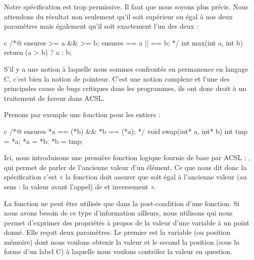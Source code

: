 Notre spécification est trop permissive. Il faut que nous soyons plus précis.
Nous attendons du résultat non seulement qu'il soit supérieur ou égal à nos 
deux paramètres mais également qu'il soit exactement l'un des deux :



\begin{CodeBlock}{c}
/*@
  ensures \result >= a && \result >= b;
  ensures \result == a || \result == b;
*/
int max(int a, int b){
  return (a > b) ? a : b;
}
\end{CodeBlock}





S'il y a une notion à laquelle nous sommes confrontés en permanence en 
langage C, c'est bien la notion de pointeur. C'est une notion complexe et 
l'une des principales cause de bugs critiques dans les programmes, ils ont 
donc droit à un traitement de faveur dans ACSL.



Prenons par exemple une fonction  pour les entiers :



\begin{CodeBlock}{c}
/*@
  ensures *a == \old(*b) && *b == \old(*a);
*/
void swap(int* a, int* b){
  int tmp = *a;
  *a = *b;
  *b = tmp;
}
\end{CodeBlock}





Ici, nous introduisons une première fonction logique fournie de base par 
ACSL : , qui permet de parler de l'ancienne valeur d'un élément. 
Ce que nous dit donc la spécification c'est « la fonction doit assurer que
 soit égal à l'ancienne valeur (au sens : la valeur avant l'appel) de 
et inversement ».



La fonction  ne peut être utilisée que dans la post-condition d'une
fonction. Si nous avons besoin de ce type d'information ailleurs, nous 
utilisons  qui nous permet d'exprimer des propriétés à propos de la 
valeur d'une variable à un point donné. Elle reçoit deux paramètres. Le premier 
est la variable (ou position mémoire) dont nous voulons obtenir la valeur et le 
second la position (sous la forme d'un label C) à laquelle nous voulons 
contrôler la valeur en question.



